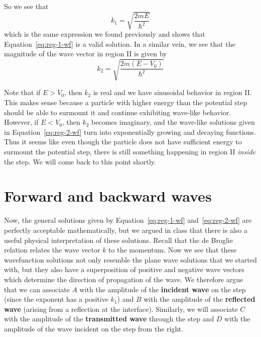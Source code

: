 So we see that
\begin{equation}
	k_1 = \sqrt{\frac{2mE}{\hbar^2}} \label{eq:reg-1-k}
\end{equation}
which is the same expression we found previously and shows that Equation~\ref{eq:reg-1-wf} is a valid solution. In a similar vein, we see that the magnitude of the wave vector in region II is given by 
\begin{equation}
	k_2 = \sqrt{\frac{2m(E-V_0)}{\hbar^2}} \label{eq:reg-2-k}
\end{equation}

Note that if $E > V_0$, then $k_2$ is real and we have sinusoidal behavior in region II. This makes sense because a particle with higher energy than the potential step should be able to surmount it and continue exhibiting wave-like behavior. However, if $E < V_0$, then $k_2$ becomes imaginary, and the wave-like solutions given in Equation~\ref{eq:reg-2-wf} turn into exponentially growing and decaying functions. Thus it seems like even though the particle does not have sufficient energy to surmount the potential step, there is still something happening in region II \emph{inside} the step. We will come back to this point shortly. \par 


\section{Forward and backward waves}
Now, the general solutions given by Equation~\ref{eq:reg-1-wf} and~\ref{eq:reg-2-wf} are perfectly acceptable mathematically, but we argued in class that there is also a useful physical interpretation of these solutions. Recall that the de Broglie relation relates the wave vector $k$ to the momentum. Now we see that these wavefunction solutions not only resemble the plane wave solutions that we started with, but they also have a superposition of positive and negative wave vectors which determine the direction of propagation of the wave. We therefore argue that we can associate $A$ with the amplitude of the \textbf{incident wave} on the step (since the exponent has a positive $k_1$) and $B$ with the amplitude of the \textbf{reflected wave} (arising from a reflection at the interface). Similarly, we will associate $C$ with the amplitude of the \textbf{transmitted wave} through the step and $D$ with the amplitude of the wave incident on the step from the right. \par 


